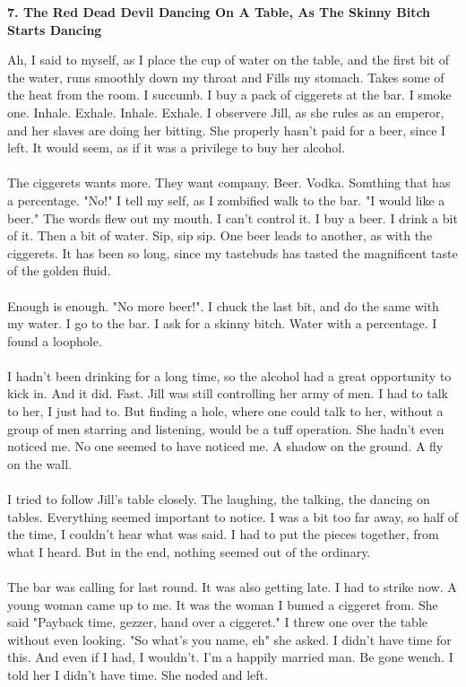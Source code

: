 \documentclass[]{article}
\begin{document}
	\newpage
	
	\begin{center}
		\large\textbf{7. The Red Dead Devil Dancing On A Table, \newline As The Skinny Bitch Starts Dancing}
	\end{center}
	
	Ah, I said to myself, as I place the cup of water on the table, and the first bit of the water, runs smoothly down my throat and Fills my stomach. Takes some of the heat from the room. I succumb. I buy a pack of ciggerets at the bar. I smoke one. Inhale. Exhale. Inhale. Exhale. I observere Jill, as she rules as an emperor, and her slaves are doing her bitting. She properly hasn't paid for a beer, since I left. It would seem, as if it was a privilege to buy her alcohol.
	\\ \\
	The ciggerets wants more. They want company. Beer. Vodka. Somthing that has a percentage. "No!" I tell my self, as I zombified walk to the bar. "I would like a beer." The words flew out my mouth. I can't control it. I buy a beer. I drink a bit of it. Then a bit of water. Sip, sip sip. One beer leads to another, as with the ciggerets. It has been so long, since my tastebuds has tasted the magnificent taste of the golden fluid. 
	\\ \\
	Enough is enough. "No more beer!". I chuck the last bit, and do the same with my water. I go to the bar. I ask for a skinny bitch. Water with a percentage. I found a loophole.
	\\ \\
	I hadn't been drinking for a long time, so the alcohol had a great opportunity to kick in. And it did. Fast. Jill was still controlling her army of men. I had to talk to her, I just had to. But finding a hole, where one could talk to her, without a group of men starring and listening, would be a tuff operation. She hadn't even noticed me. No one seemed to have noticed me. A shadow on the ground. A fly on the wall.
	\\ \\
	I tried to follow Jill's table closely. The laughing, the talking, the dancing on tables. Everything seemed important to notice. I was a bit too far away, so half of the time, I couldn't hear what was said. I had to put the pieces together, from what I heard. But in the end, nothing seemed out of the ordinary.
	\\ \\
	The bar was calling for last round. It was also getting late. I had to strike now. A young woman came up to me. It was the woman I bumed a ciggeret from. She said "Payback time, gezzer, hand over a ciggeret." I threw one over the table without even looking. "So what's you name, eh" she asked. I didn't have time for this. And even if I had, I wouldn't. I'm a happily married man. Be gone wench. I told her I didn't have time. She noded and left.
\end{document}
